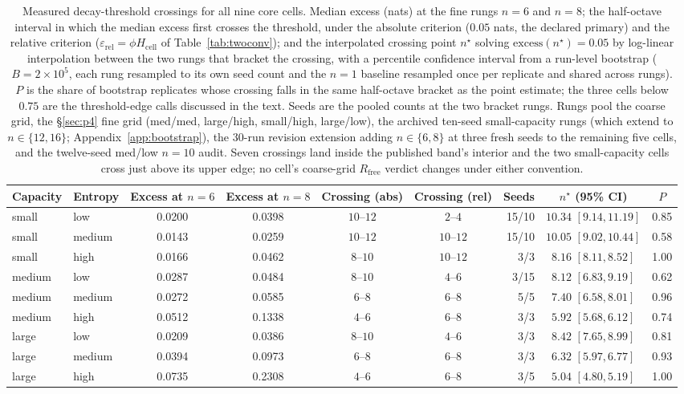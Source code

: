 \documentclass[11pt]{article}
\begin{document}
\begin{table}[htbp]
\centering
\caption{Measured decay-threshold crossings for all nine core cells. Median excess
(nats) at the fine rungs $n{=}6$ and $n{=}8$; the half-octave interval in which the
median excess first crosses the threshold, under the absolute criterion ($0.05$
nats, the declared primary) and the relative criterion
($\varepsilon_{\mathrm{rel}} = \phi H_{\mathrm{cell}}$ of Table~\ref{tab:twoconv});
and the interpolated crossing point $n^\star$ solving
$\mathrm{excess}(n^\star) = 0.05$ by log-linear interpolation between the two rungs
that bracket the crossing, with a percentile confidence interval from a run-level
bootstrap ($B = 2\times10^{5}$, each rung resampled to its own seed count and the
$n{=}1$ baseline resampled once per replicate and shared across rungs). $P$ is the
share of bootstrap replicates whose crossing falls in the same half-octave bracket
as the point estimate; the three cells below $0.75$ are the threshold-edge calls
discussed in the text. Seeds are the pooled counts at the two bracket rungs.
Rungs pool the coarse grid, the \S\ref{sec:p4} fine grid (med/med, large/high,
small/high, large/low), the archived ten-seed small-capacity rungs (which extend to
$n\in\{12,16\}$; Appendix~\ref{app:bootstrap}), the 30-run revision extension
adding $n\in\{6,8\}$ at three fresh seeds to the remaining five cells, and the
twelve-seed med/low $n{=}10$ audit. Seven crossings land inside the published
band's interior and the two small-capacity cells cross just above its upper edge;
no cell's coarse-grid $R_{\mathrm{free}}$ verdict changes under either convention.}
\label{tab:crossings}
\scriptsize
\begin{tabular}{@{}llccccrcc@{}}
\toprule
Capacity & Entropy & Excess at $n{=}6$ & Excess at $n{=}8$ & Crossing (abs) & Crossing (rel) & Seeds & $n^\star$ (95\% CI) & $P$ \\
\midrule
small & low    & 0.0200 & 0.0398 & $10$--$12$ & $2$--$4$   & 15/10 & $10.34$ $[9.14, 11.19]$ & 0.85 \\
small & medium & 0.0143 & 0.0259 & $10$--$12$ & $10$--$12$ & 15/10 & $10.05$ $[9.02, 10.44]$ & 0.58 \\
small & high   & 0.0166 & 0.0462 & $8$--$10$  & $10$--$12$ & 3/3   & $8.16$ $[8.11, 8.52]$   & 1.00 \\
\midrule
medium & low    & 0.0287 & 0.0484 & $8$--$10$ & $4$--$6$ & 3/15 & $8.12$ $[6.83, 9.19]$ & 0.62 \\
medium & medium & 0.0272 & 0.0585 & $6$--$8$  & $6$--$8$ & 5/5  & $7.40$ $[6.58, 8.01]$ & 0.96 \\
medium & high   & 0.0512 & 0.1338 & $4$--$6$  & $6$--$8$ & 3/3  & $5.92$ $[5.68, 6.12]$ & 0.74 \\
\midrule
large & low    & 0.0209 & 0.0386 & $8$--$10$ & $4$--$6$ & 3/3 & $8.42$ $[7.65, 8.99]$ & 0.81 \\
large & medium & 0.0394 & 0.0973 & $6$--$8$  & $6$--$8$ & 3/3 & $6.32$ $[5.97, 6.77]$ & 0.93 \\
large & high   & 0.0735 & 0.2308 & $4$--$6$  & $6$--$8$ & 3/5 & $5.04$ $[4.80, 5.19]$ & 1.00 \\
\bottomrule
\end{tabular}
\end{table}
\end{document}
